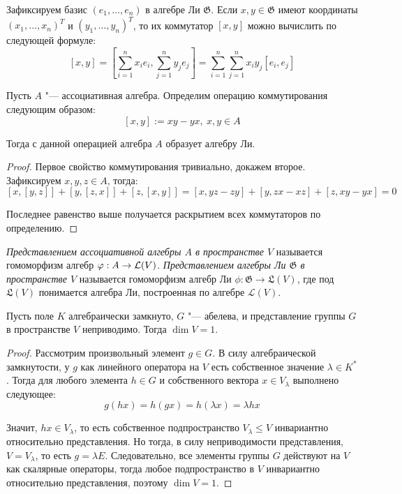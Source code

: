 \begin{note}
	Зафиксируем базис $(e_1, \dotsc, e_n)$ в алгебре Ли $\mathfrak G$. Если $x, y \in \mathfrak G$ имеют координаты $(x_1, \dotsc, x_n)^T$ и $(y_1, \dotsc, y_n)^T$, то их коммутатор $[x, y]$ можно вычислить по следующей формуле:
	\[[x, y] = \left[\sum_{i=1}^nx_ie_i, \sum_{j=1}^ny_je_j\right] = \sum_{i=1}^n\sum_{j=1}^nx_iy_j[e_i, e_j]\]
\end{note}

\begin{proposition}
	Пусть $A$ "--- ассоциативная алгебра. Определим операцию коммутирования следующим образом:
	\[[x, y] := xy - yx,~x, y \in A\]
	
	Тогда с данной операцией алгебра $A$ образует алгебру Ли.
\end{proposition}

\begin{proof}
	Первое свойство коммутирования тривиально, докажем второе. Зафиксируем $x, y, z \in A$, тогда:
	\[[x, [y, z]] + [y, [z, x]] + [z, [x, y]] = [x, yz - zy] + [y, zx - xz] + [z, xy - yx] = 0\]
	
	Последнее равенство выше получается раскрытием всех коммутаторов по определению.
\end{proof}

\begin{definition}
	\textit{Представлением ассоциативной алгебры $A$ в пространстве $V$} называется гомоморфизм алгебр $\varphi : A \to \mathcal L(V)$. \textit{Представлением алгебры Ли $\mathfrak G$ в пространстве $V$} называется гомоморфизм алгебр Ли $\phi : \mathfrak{G} \to \mathfrak{L}(V)$, где под $\mathfrak{L}(V)$ понимается алгебра Ли, построенная по алгебре $\mathcal L(V)$.
\end{definition}

\begin{proposition}
	Пусть поле $K$ алгебраически замкнуто, $G$ "--- абелева, и представление группы $G$ в пространстве $V$ неприводимо. Тогда $\dim {V} = 1$.
\end{proposition}

\begin{proof}
	Рассмотрим произвольный элемент $g \in G$. В силу алгебраической замкнутости, у $g$ как линейного оператора на $V$ есть собственное значение $\lambda \in K^*$. Тогда для любого элемента $h \in G$ и собственного вектора $x \in V_{\lambda}$ выполнено следующее:
	\[g(hx) = h(gx) = h(\lambda x) = \lambda hx\]
	
	Значит, $hx \in V_{\lambda}$, то есть собственное подпространство $V_{\lambda} \le V$ инвариантно относительно представления. Но тогда, в силу неприводимости представления, $V = V_{\lambda}$, то есть $g = \lambda E$. Следовательно, все элементы группы $G$ действуют на $V$ как скалярные операторы, тогда любое подпространство в $V$ инвариантно относительно представления, поэтому $\dim{V} = 1$.
\end{proof}

